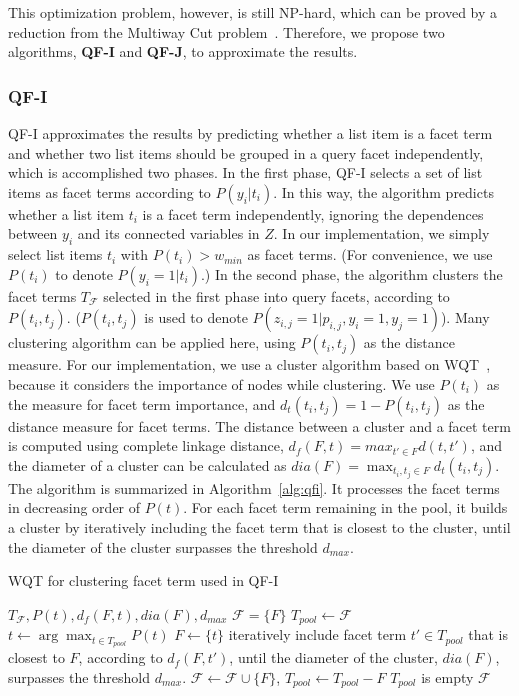 This optimization problem, however, is still NP-hard, which can be proved by a reduction from the Multiway Cut problem~\cite{bansal2002correlation}.
Therefore, we propose two algorithms, \textbf{QF-I} and \textbf{QF-J}, to approximate the results.

\subsubsection{QF-I}
QF-I approximates the results by predicting whether a list item is a facet term and whether two list items should be grouped in a query facet independently, which is accomplished two phases.
In the first phase, QF-I selects a set of list items as facet terms according to $P(y_i|t_i)$.
In this way, the algorithm predicts whether a list item $t_i$ is a facet term independently, ignoring the dependences between $y_i$ and its connected variables in $Z$.
In our implementation, we simply select list items $t_i$ with  $P(t_i)> w_{min}$ as facet terms. (For convenience, we use $P(t_i)$ to denote $P(y_i=1|t_i)$.)
In the second phase, the algorithm clusters the facet terms $T_\mathcal{F}$ selected in the first phase into query facets, according to $P(t_i,t_j)$. ($P(t_i, t_j)$ is used to denote $P(z_{i,j}=1|p_{i,j},y_i=1,y_j=1)$).
Many clustering algorithm can be applied here, using $P(t_i,t_j)$ as the distance measure.
For our implementation, we use a cluster algorithm based on WQT~\cite{dou2011finding}, because it considers the importance of nodes while clustering.
We use $P(t_i)$ as the measure for facet term importance, and $d_t(t_i,t_j)=1-P(t_i, t_j)$ as the distance measure for facet terms. The distance between a cluster and a facet term is computed using complete linkage distance, $d_f(F,t)=max_{t' \in F}{d(t, t')}$, and the diameter of a cluster can be calculated as $dia(F)=\max_{t_i,t_j\in F}{d_t(t_i,t_j)}$. The algorithm is summarized in Algorithm~\ref{alg:qfi}. It processes the facet terms in decreasing order of $P(t)$. For each facet term remaining in the pool, it builds a cluster by iteratively including the facet term that is closest to the cluster, until the diameter of the cluster surpasses the threshold $d_{max}$.
\begin{algorithm}[ht!]
 \caption{WQT for clustering facet term used in QF-I}
\label{alg:qfi}
\begin{algorithmic}[1]
  \Require $T_{\mathcal{F}}, P(t), d_f(F,t), dia(F), d_{max}$
  \Ensure $\mathcal{F}=\{F\}$
  \State $T_{pool} \leftarrow \mathcal{F}$
  \Repeat
    \State $t \leftarrow \arg\max_{t\in T_{pool}}{P(t)}$
    \State $F \leftarrow \{t\}$
    \State iteratively include facet term $t' \in T_{pool}$ that is closest to $F$, according to $d_f(F,t')$, until the diameter of the cluster, $dia(F)$, surpasses the threshold $d_{max}$.
    \State $\mathcal{F} \leftarrow \mathcal{F} \cup \{F\}$, $T_{pool} \leftarrow T_{pool} - F$
  \Until $T_{pool}$ is empty
  \State \Return $\mathcal{F}$
\end{algorithmic}
\end{algorithm}


